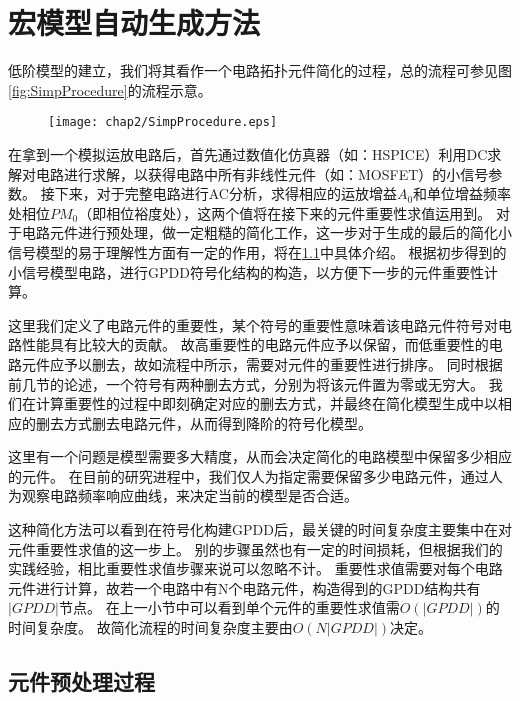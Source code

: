 \section{宏模型自动生成方法}
\label{subsec:simp:alg:top}

低阶模型的建立，我们将其看作一个电路拓扑元件简化的过程，总的流程可参见图\ref{fig:SimpProcedure}的流程示意。

\begin{figure}[!htp]
	\centering
	\texttt{[image: chap2/SimpProcedure.eps]}
\end{figure}

在拿到一个模拟运放电路后，首先通过数值化仿真器（如：HSPICE）利用DC求解对电路进行求解，以获得电路中所有非线性元件（如：MOSFET）的小信号参数。
接下来，对于完整电路进行AC分析，求得相应的运放增益$A_0$和单位增益频率处相位$PM_0$（即相位裕度处），这两个值将在接下来的元件重要性求值运用到。
对于电路元件进行预处理，做一定粗糙的简化工作，这一步对于生成的最后的简化小信号模型的易于理解性方面有一定的作用，将在\ref{subsec:simp:alg:pre}中具体介绍。
根据初步得到的小信号模型电路，进行GPDD符号化结构的构造，以方便下一步的元件重要性计算。

这里我们定义了电路元件的重要性，某个符号的重要性意味着该电路元件符号对电路性能具有比较大的贡献。
故高重要性的电路元件应予以保留，而低重要性的电路元件应予以删去，故如流程中所示，需要对元件的重要性进行排序。
同时根据前几节的论述，一个符号有两种删去方式，分别为将该元件置为零或无穷大。
我们在计算重要性的过程中即刻确定对应的删去方式，并最终在简化模型生成中以相应的删去方式删去电路元件，从而得到降阶的符号化模型。

这里有一个问题是模型需要多大精度，从而会决定简化的电路模型中保留多少相应的元件。
在目前的研究进程中，我们仅人为指定需要保留多少电路元件，通过人为观察电路频率响应曲线，来决定当前的模型是否合适。

这种简化方法可以看到在符号化构建GPDD后，最关键的时间复杂度主要集中在对元件重要性求值的这一步上。
别的步骤虽然也有一定的时间损耗，但根据我们的实践经验，相比重要性求值步骤来说可以忽略不计。
重要性求值需要对每个电路元件进行计算，故若一个电路中有N个电路元件，构造得到的GPDD结构共有$\left|GPDD\right|$节点。
在上一小节中可以看到单个元件的重要性求值需$O\left(\left|GPDD\right|\right)$的时间复杂度。
故简化流程的时间复杂度主要由$O\left(N\left|GPDD\right|\right)$决定。

\subsection{元件预处理过程}
\label{subsec:simp:alg:pre}

